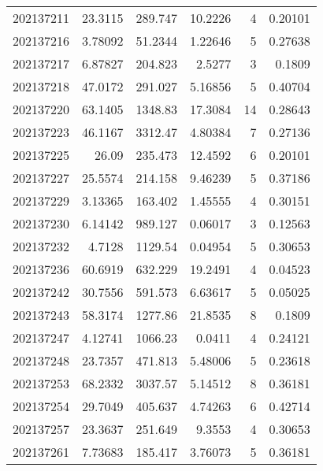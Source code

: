 \begin{tabular}{rrrrrr}
 202137211 &         23.3115  &      289.747  &           10.2226  &           4 & 0.20101 \\
 202137216 &          3.78092 &       51.2344 &            1.22646 &           5 & 0.27638 \\
 202137217 &          6.87827 &      204.823  &            2.5277  &           3 & 0.1809  \\
 202137218 &         47.0172  &      291.027  &            5.16856 &           5 & 0.40704 \\
 202137220 &         63.1405  &     1348.83   &           17.3084  &          14 & 0.28643 \\
 202137223 &         46.1167  &     3312.47   &            4.80384 &           7 & 0.27136 \\
 202137225 &         26.09    &      235.473  &           12.4592  &           6 & 0.20101 \\
 202137227 &         25.5574  &      214.158  &            9.46239 &           5 & 0.37186 \\
 202137229 &          3.13365 &      163.402  &            1.45555 &           4 & 0.30151 \\
 202137230 &          6.14142 &      989.127  &            0.06017 &           3 & 0.12563 \\
 202137232 &          4.7128  &     1129.54   &            0.04954 &           5 & 0.30653 \\
 202137236 &         60.6919  &      632.229  &           19.2491  &           4 & 0.04523 \\
 202137242 &         30.7556  &      591.573  &            6.63617 &           5 & 0.05025 \\
 202137243 &         58.3174  &     1277.86   &           21.8535  &           8 & 0.1809  \\
 202137247 &          4.12741 &     1066.23   &            0.0411  &           4 & 0.24121 \\
 202137248 &         23.7357  &      471.813  &            5.48006 &           5 & 0.23618 \\
 202137253 &         68.2332  &     3037.57   &            5.14512 &           8 & 0.36181 \\
 202137254 &         29.7049  &      405.637  &            4.74263 &           6 & 0.42714 \\
 202137257 &         23.3637  &      251.649  &            9.3553  &           4 & 0.30653 \\
 202137261 &          7.73683 &      185.417  &            3.76073 &           5 & 0.36181 \\

\end{tabular}
